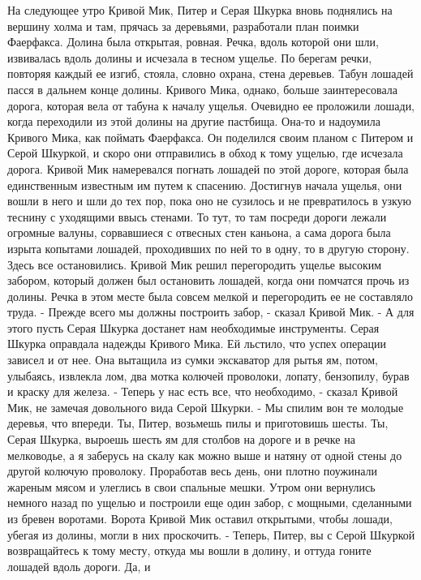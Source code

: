     На следующее утро Кривой Мик, Питер и Серая Шкурка вновь поднялись 
на вершину холма и там, прячась за деревьями, разработали план поимки 
Фаерфакса. Долина была открытая, ровная. Речка, вдоль которой они шли, 
извивалась вдоль долины и исчезала в тесном ущелье. По берегам речки, 
повторяя каждый ее изгиб, стояла, словно охрана, стена деревьев.
    Табун лошадей пасся в дальнем конце долины. Кривого Мика, однако, 
больше заинтересовала дорога, которая вела от табуна к началу ущелья. 
Очевидно ее проложили лошади, когда переходили из этой долины на 
другие пастбища. Она-то и надоумила Кривого Мика, как поймать 
Фаерфакса.
    Он поделился своим планом с Питером и Серой Шкуркой, и скоро они 
отправились в обход к тому ущелью, где исчезала дорога. Кривой Мик 
намеревался погнать лошадей по этой дороге, которая была единственным 
известным им путем к спасению.
    Достигнув начала ущелья, они вошли в него и шли до тех пор, пока 
оно не сузилось и не превратилось в узкую теснину с уходящими ввысь 
стенами. То тут, то там посреди дороги лежали огромные валуны, 
сорвавшиеся с отвесных стен каньона, а сама дорога была изрыта 
копытами лошадей, проходивших по ней то в одну, то в другую сторону.
    Здесь все остановились. Кривой Мик решил перегородить ущелье 
высоким забором, который должен был остановить лошадей, когда они 
помчатся прочь из долины. Речка в этом месте была совсем мелкой и 
перегородить ее не составляло труда.
    - Прежде всего мы должны построить забор, - сказал Кривой Мик. - А 
для этого пусть Серая Шкурка достанет нам необходимые инструменты. 
Серая Шкурка оправдала надежды Кривого Мика. Ей льстило, что успех 
операции зависел и от нее. Она вытащила из сумки экскаватор для рытья 
ям, потом, улыбаясь, извлекла лом, два мотка колючей проволоки, 
лопату, бензопилу, бурав и краску для железа.
    - Теперь у нас есть все, что необходимо, - сказал Кривой Мик, не 
замечая довольного вида Серой Шкурки. - Мы спилим вон те молодые 
деревья, что впереди. Ты, Питер, возьмешь пилы и приготовишь шесты. 
Ты, Серая Шкурка, выроешь шесть ям для столбов на дороге и в речке на 
мелководье, а я заберусь на скалу как можно выше и натяну от одной 
стены до другой колючую проволоку.
    Проработав весь день, они плотно поужинали жареным мясом и 
улеглись в свои спальные мешки. Утром они вернулись немного назад по 
ущелью и построили еще один забор, с мощными, сделанными из бревен 
воротами. Ворота Кривой Мик оставил открытыми, чтобы лошади, убегая из 
долины, могли в них проскочить.
    - Теперь, Питер, вы с Серой Шкуркой возвращайтесь к тому месту, 
откуда мы вошли в долину, и оттуда гоните лошадей вдоль дороги. Да, и 
